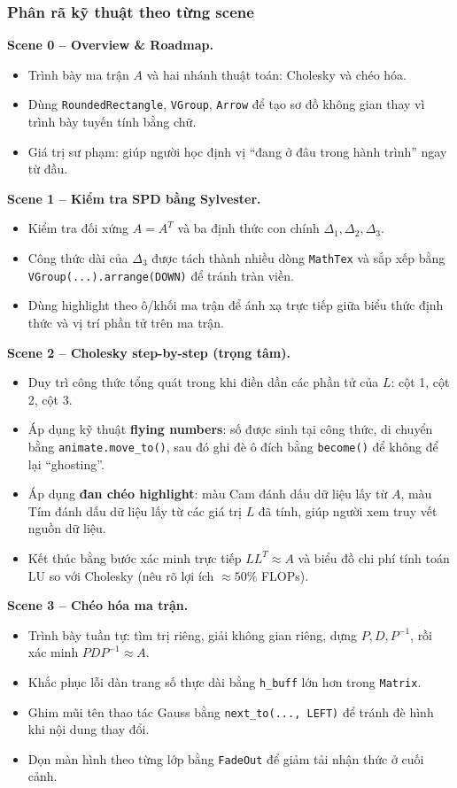 \documentclass[a4paper]{article}
\begin{document}
\subsubsection{Phân rã kỹ thuật theo từng scene}

\textbf{Scene 0 -- Overview \& Roadmap.}
\begin{itemize}
    \item Trình bày ma trận $A$ và hai nhánh thuật toán: Cholesky và chéo hóa.
    \item Dùng \texttt{RoundedRectangle}, \texttt{VGroup}, \texttt{Arrow} để tạo sơ đồ không gian thay vì trình bày tuyến tính bằng chữ.
    \item Giá trị sư phạm: giúp người học định vị ``đang ở đâu trong hành trình'' ngay từ đầu.
\end{itemize}

\textbf{Scene 1 -- Kiểm tra SPD bằng Sylvester.}
\begin{itemize}
    \item Kiểm tra đối xứng $A=A^T$ và ba định thức con chính $\Delta_1,\Delta_2,\Delta_3$.
    \item Công thức dài của $\Delta_3$ được tách thành nhiều dòng \texttt{MathTex} và sắp xếp bằng \texttt{VGroup(...).arrange(DOWN)} để tránh tràn viền.
    \item Dùng highlight theo ô/khối ma trận để ánh xạ trực tiếp giữa biểu thức định thức và vị trí phần tử trên ma trận.
\end{itemize}

\textbf{Scene 2 -- Cholesky step-by-step (trọng tâm).}
\begin{itemize}
    \item Duy trì công thức tổng quát trong khi điền dần các phần tử của $L$: cột 1, cột 2, cột 3.
    \item Áp dụng kỹ thuật \textbf{flying numbers}: số được sinh tại công thức, di chuyển bằng \texttt{animate.move\_to()}, sau đó ghi đè ô đích bằng \texttt{become()} để không để lại ``ghosting''.
    \item Áp dụng \textbf{đan chéo highlight}: màu Cam đánh dấu dữ liệu lấy từ $A$, màu Tím đánh dấu dữ liệu lấy từ các giá trị $L$ đã tính, giúp người xem truy vết nguồn dữ liệu.
    \item Kết thúc bằng bước xác minh trực tiếp $LL^T\approx A$ và biểu đồ chi phí tính toán LU so với Cholesky (nêu rõ lợi ích $\approx 50\%$ FLOPs).
\end{itemize}

\textbf{Scene 3 -- Chéo hóa ma trận.}
\begin{itemize}
    \item Trình bày tuần tự: tìm trị riêng, giải không gian riêng, dựng $P,D,P^{-1}$, rồi xác minh $PDP^{-1}\approx A$.
    \item Khắc phục lỗi dàn trang số thực dài bằng \texttt{h\_buff} lớn hơn trong \texttt{Matrix}.
    \item Ghim mũi tên thao tác Gauss bằng \texttt{next\_to(..., LEFT)} để tránh đè hình khi nội dung thay đổi.
    \item Dọn màn hình theo từng lớp bằng \texttt{FadeOut} để giảm tải nhận thức ở cuối cảnh.
\end{itemize}
\end{document}
